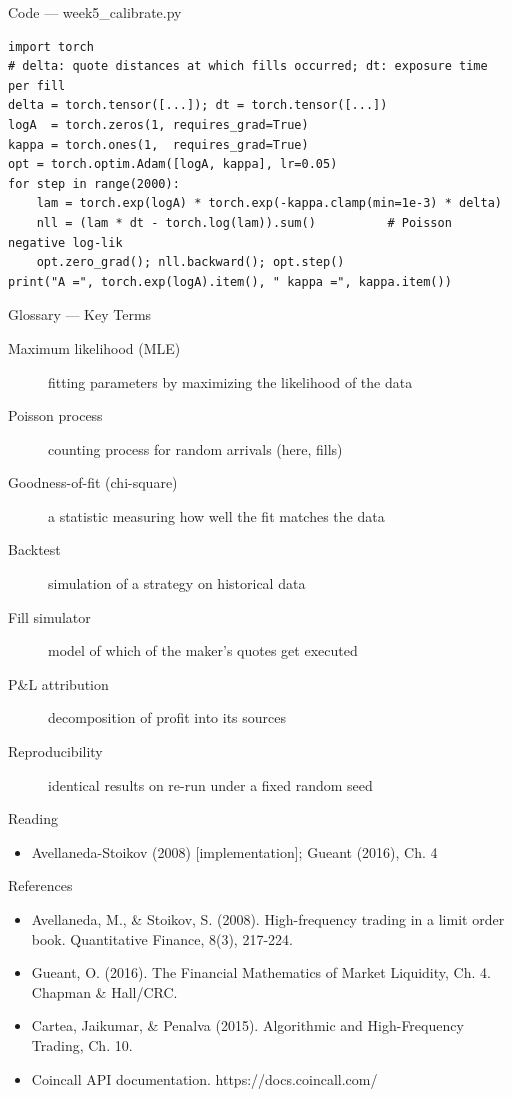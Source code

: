 \documentclass[aspectratio=169,10pt]{beamer}
\begin{document}
\begin{frame}[fragile]{Code --- week5\_calibrate.py}
\begin{lstlisting}
import torch
# delta: quote distances at which fills occurred; dt: exposure time per fill
delta = torch.tensor([...]); dt = torch.tensor([...])
logA  = torch.zeros(1, requires_grad=True)
kappa = torch.ones(1,  requires_grad=True)
opt = torch.optim.Adam([logA, kappa], lr=0.05)
for step in range(2000):
    lam = torch.exp(logA) * torch.exp(-kappa.clamp(min=1e-3) * delta)
    nll = (lam * dt - torch.log(lam)).sum()          # Poisson negative log-lik
    opt.zero_grad(); nll.backward(); opt.step()
print("A =", torch.exp(logA).item(), " kappa =", kappa.item())
\end{lstlisting}
\end{frame}
\begin{frame}{Glossary --- Key Terms}
\footnotesize\begin{description}
\item[\color{ncsured}Maximum likelihood (MLE)] fitting parameters by maximizing the likelihood of the data
\item[\color{ncsured}Poisson process] counting process for random arrivals (here, fills)
\item[\color{ncsured}Goodness-of-fit (chi-square)] a statistic measuring how well the fit matches the data
\item[\color{ncsured}Backtest] simulation of a strategy on historical data
\item[\color{ncsured}Fill simulator] model of which of the maker's quotes get executed
\item[\color{ncsured}P\&L attribution] decomposition of profit into its sources
\item[\color{ncsured}Reproducibility] identical results on re-run under a fixed random seed
\end{description}
\end{frame}

\begin{frame}{Reading}
\begin{itemize}
  \item Avellaneda-Stoikov (2008) [implementation]; Gueant (2016), Ch. 4
\end{itemize}
\end{frame}

\begin{frame}{References}
\scriptsize\begin{itemize}\setlength{\itemsep}{3pt}
  \item Avellaneda, M., \& Stoikov, S. (2008). High-frequency trading in a limit order book. Quantitative Finance, 8(3), 217-224.
  \item Gueant, O. (2016). The Financial Mathematics of Market Liquidity, Ch. 4. Chapman \& Hall/CRC.
  \item Cartea, Jaikumar, \& Penalva (2015). Algorithmic and High-Frequency Trading, Ch. 10.
  \item Coincall API documentation. https://docs.coincall.com/
\end{itemize}
\end{frame}
\end{document}
